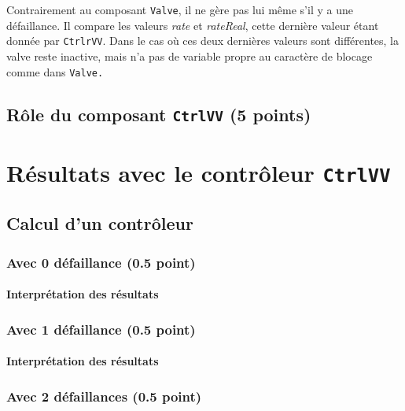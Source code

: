 \documentclass[a4paper]{book}
\begin{document}
Contrairement au composant {\tt Valve}, il ne gère pas lui même s'il y a une défaillance. Il compare les valeurs \textit{rate} et \textit{rateReal}, cette dernière valeur étant donnée par {\tt CtrlrVV}. Dans le cas où ces deux dernières valeurs sont différentes, la valve reste inactive, mais n'a pas de variable propre au caractère de blocage comme dans \tt{Valve}.

\subsection{Rôle du composant {\tt CtrlVV} (5 points)}

\section{Résultats avec le contrôleur {\tt CtrlVV}}
\subsection{Calcul d'un contrôleur}
\subsubsection{Avec 0 défaillance (0.5 point)}



%
%
\paragraph{Interprétation des résultats}

\subsubsection{Avec 1 défaillance (0.5 point)}





\paragraph{Interprétation des résultats}

\subsubsection{Avec 2 défaillances (0.5 point)}




%
\end{document}
